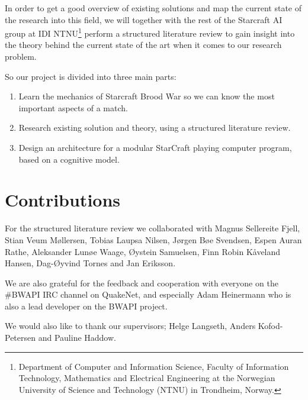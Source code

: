 In order to get a good overview of existing solutions and map the current state
of the research into this field, we will together with the rest of the Starcraft AI group at IDI NTNU\footnote{Department of Computer and Information Science, Faculty of Information Technology, Mathematics and Electrical Engineering at the Norwegian University of Science and Technology (NTNU) in Trondheim, Norway.} perform a structured literature review to gain insight into the theory behind the current state of the art
when it comes to our research problem.

So our project is divided into three main parts:
\begin{enumerate}
  \item Learn the mechanics of Starcraft Brood War so we can know the most important aspects of a match.
  \item Research existing solution and theory, using a structured literature review.
  \item Design an architecture for a modular StarCraft playing computer
program, based on a cognitive model.
\end{enumerate}

\section{Contributions}
\label{sec:contributions}
For the structured literature review we collaborated with Magnus Sellereite
Fjell, Stian Veum M{\o}llersen, Tobias Laupsa Nilsen, J{\o}rgen B{\o}e Svendsen,
Espen Auran Rathe, Aleksander Lun{\o}e Waage, {\O}ystein Samuelsen, Finn Robin
K{\aa}veland Hansen, Dag-{\O}yvind Tornes and Jan Eriksson.

We are also grateful for the feedback and cooperation with everyone on the
\#BWAPI IRC channel on QuakeNet, and especially Adam Heinermann who is also a
lead developer on the BWAPI project.

We would also like to thank our supervisors; Helge Langseth, Anders
Kofod-Petersen and Pauline Haddow.

